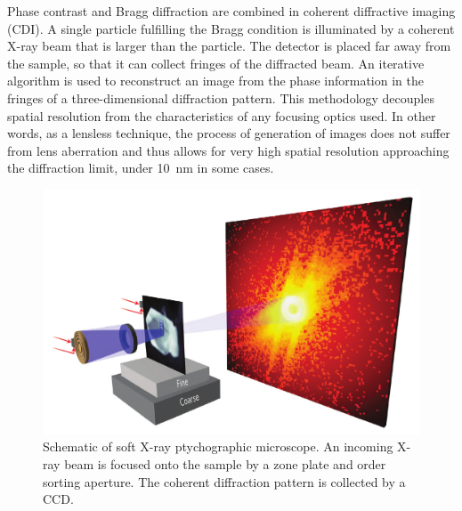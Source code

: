 \documentclass[journal=cmatex,manuscript=perspective]{achemso}
\begin{document}
Phase contrast and Bragg diffraction are combined in coherent
diffractive imaging (CDI). A single particle fulfilling the Bragg
condition is illuminated by a coherent X-ray beam that is larger than
the particle. The detector is placed far away from the sample, so that
it can collect fringes of the diffracted beam. An iterative algorithm
is used to reconstruct an image from the phase information in the
fringes of a three-dimensional diffraction
pattern\cite{robinson2009}. This methodology decouples spatial
resolution from the characteristics of any focusing optics used. In
other words, as a lensless technique, the process of generation of
images does not suffer from lens aberration and thus allows for very
high spatial resolution approaching the diffraction limit, under
\SI{10}{nm} in some cases.

\begin{figure}
  \includegraphics[width=\textwidth]{shapiro2014.png}
  \caption{Schematic of soft X-ray ptychographic microscope. An
    incoming X-ray beam is focused onto the sample by a zone plate and
    order sorting aperture. The coherent diffraction pattern is
    collected by a CCD\cite{shapiro2014}.}
  \label{figure:shapiro2014}
\end{figure}
\end{document}
